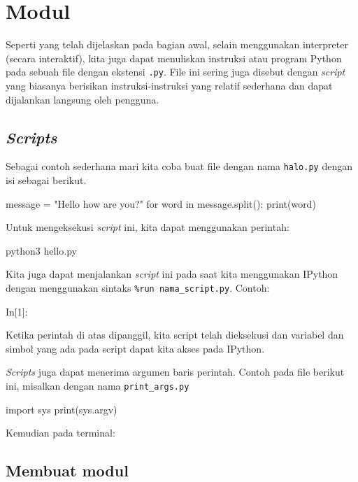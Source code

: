 \section{Modul}

Seperti yang telah dijelaskan pada bagian awal, selain menggunakan interpreter (secara interaktif),
kita juga dapat menuliskan instruksi atau program Python pada sebuah file dengan ekstensi \texttt{.py}.
File ini sering juga disebut dengan \textit{script} yang biasanya berisikan instruksi-instruksi yang
relatif sederhana dan dapat dijalankan langsung oleh pengguna.

\subsection{\textit{Scripts}}

Sebagai contoh sederhana mari kita coba buat file dengan nama \texttt{halo.py}
dengan isi sebagai berikut.
\begin{pythoncode}
message = "Hello how are you?"
for word in message.split():
    print(word)
\end{pythoncode}

Untuk mengeksekusi \textit{script} ini, kita dapat menggunakan perintah:
\begin{bashcode}
python3 hello.py
\end{bashcode}

Kita juga dapat menjalankan \textit{script} ini pada saat kita menggunakan
IPython dengan menggunakan sintaks \texttt{\%run nama\_script.py}.
Contoh:
\begin{ipython3code}
In[1]: %
\end{ipython3code}
Ketika perintah di atas dipanggil, kita script telah dieksekusi dan variabel dan
simbol yang ada pada script dapat kita akses pada IPython.

\textit{Scripts} juga dapat menerima argumen baris perintah.
Contoh pada file berikut ini, misalkan dengan nama \texttt{print\_args.py}
\begin{pythoncode}
import sys
print(sys.argv)
\end{pythoncode}
Kemudian pada terminal:


\subsection{Membuat modul}

